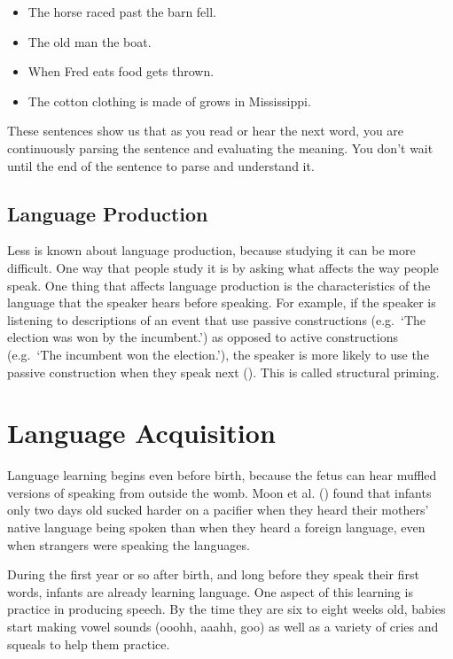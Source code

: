 \documentclass[
]{krantz}
\providecommand{\tightlist}{%
  \setlength{\itemsep}{0pt}\setlength{\parskip}{0pt}}
\begin{document}
\begin{itemize}
\tightlist
\item
  The horse raced past the barn fell.
\item
  The old man the boat.
\item
  When Fred eats food gets thrown.
\item
  The cotton clothing is made of grows in Mississippi.
\end{itemize}

These sentences show us that as you read or hear the next word, you are continuously parsing the sentence and evaluating the meaning. You don't wait until the end of the sentence to parse and understand it.

\subsection*{Language Production}\label{language-production}


Less is known about language production, because studying it can be more difficult. One way that people study it is by asking what affects the way people speak. One thing that affects language production is the characteristics of the language that the speaker hears before speaking. For example, if the speaker is listening to descriptions of an event that use passive constructions (e.g.~`The election was won by the incumbent.') as opposed to active constructions (e.g.~`The incumbent won the election.'), the speaker is more likely to use the passive construction when they speak next (). This is called structural priming.

\section{Language Acquisition}\label{language-acquisition}

Language learning begins even before birth, because the fetus can hear muffled versions of speaking from outside the womb. Moon et al. () found that infants only two days old sucked harder on a pacifier when they heard their mothers' native language being spoken than when they heard a foreign language, even when strangers were speaking the languages.

During the first year or so after birth, and long before they speak their first words, infants are already learning language. One aspect of this learning is practice in producing speech. By the time they are six to eight weeks old, babies start making vowel sounds (ooohh, aaahh, goo) as well as a variety of cries and squeals to help them practice.
\end{document}

